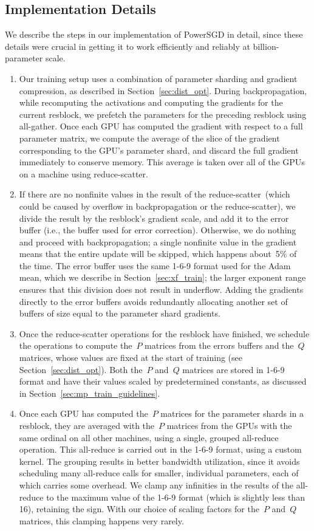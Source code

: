 \documentclass{article}
\begin{document}
\subsection{Implementation Details}
\label{sec:dist_train_impl}

We describe the steps in our implementation of PowerSGD in detail, since these details were crucial in getting it to work efficiently and reliably at billion-parameter scale.
\begin{enumerate}
    \item Our training setup uses a combination of parameter sharding and gradient compression, as described in Section~\ref{sec:dist_opt}. During backpropagation, while recomputing the activations and computing the gradients for the current resblock, we prefetch the parameters for the preceding resblock using all-gather. Once each GPU has computed the gradient with respect to a full parameter matrix, we compute the average of the slice of the gradient corresponding to the GPU's parameter shard, and discard the full gradient immediately to conserve memory. This average is taken over all of the GPUs on a machine using reduce-scatter.
    \item If there are no nonfinite values in the result of the reduce-scatter~(which could be caused by overflow in backpropagation or the reduce-scatter), we divide the result by the resblock's gradient scale, and add it to the error buffer (i.e., the buffer used for error correction). Otherwise, we do nothing and proceed with backpropagation; a single nonfinite value in the gradient means that the entire update will be skipped, which happens about~5\% of the time. The error buffer uses the same 1-6-9 format used for the Adam mean, which we describe in Section~\ref{sec:xf_train}; the larger exponent range ensures that this division does not result in underflow. Adding the gradients directly to the error buffers avoids redundantly allocating another set of buffers of size equal to the parameter shard gradients.
    \item Once the reduce-scatter operations for the resblock have finished, we schedule the operations to compute the~$P$ matrices from the errors buffers and the~$Q$ matrices, whose values are fixed at the start of training (see Section~\ref{sec:dist_opt}). Both the~$P$ and~$Q$ matrices are stored in 1-6-9 format and have their values scaled by predetermined constants, as discussed in Section~\ref{sec:mp_train_guidelines}.
    \item Once each GPU has computed the~$P$ matrices for the parameter shards in a resblock, they are averaged with the~$P$ matrices from the GPUs with the same ordinal on all other machines, using a single, grouped all-reduce operation. This all-reduce is carried out in the 1-6-9 format, using a custom kernel. The grouping results in better bandwidth utilization, since it avoids scheduling many all-reduce calls for smaller, individual parameters, each of which carries some overhead. We clamp any infinities in the results of the all-reduce to the maximum value of the 1-6-9 format (which is slightly less than 16), retaining the sign. With our choice of scaling factors for the~$P$ and~$Q$ matrices, this clamping happens very rarely.

\end{enumerate}
\end{document}
